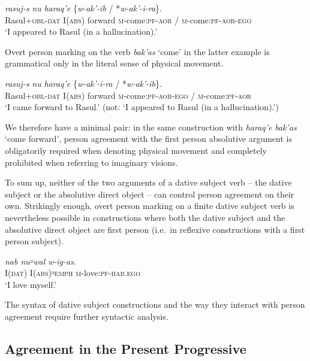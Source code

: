 ﻿\documentclass[output=paper]{langsci/langscibook}
\begin{document}
\ex %
\gll \emph{rasuj-s} \emph{nu} \emph{haraq'e} \{\emph{w-ak'-ib} / *\emph{w-ak'-i-ra}\}.\\
Rasul+\textsc{obl}-\textsc{dat} I(\textsc{abs}) forward \textsc{m}-come:\textsc{pf}-\textsc{aor} / \textsc{m}-come:\textsc{pf}-\textsc{aor}-\textsc{ego}\\
\glt `I appeared to Rasul (in a hallucination).'
\z
\z

Overt person marking on the verb \emph{bak'as} `come' in the latter
example is grammatical only in the literal sense of physical movement.

\ea %
\gll \emph{rasuj-s} \emph{nu} \emph{haraq'e} \{\emph{w-ak'-i-ra} / *\emph{w-ak'-ib}\}.\\
Rasul+\textsc{obl}-\textsc{dat} I(\textsc{abs}) forward \textsc{m}-come:\textsc{pf}-\textsc{aor}-\textsc{ego} / \textsc{m}-come:\textsc{pf}-\textsc{aor}\\\unskip
\glt `I came forward to Rasul.' (not: `I appeared to Rasul (in a
hallucination).')
\z

We therefore have a minimal pair: in the same construction with
\emph{haraq'e} \emph{bak'as} `come forward', person agreement with the first
person absolutive argument is obligatorily required when denoting
physical movement and completely prohibited when referring to imaginary
visions.

To sum up, neither of the two arguments of a dative subject verb – the
dative subject or the absolutive direct object – can control person
agreement on their own. Strikingly enough, overt person marking on a
finite dative subject verb is nevertheless possible in constructions
where both the dative subject and the absolutive direct object are first
person (i.e.\ in reflexive constructions with a first person subject).

\ea %
\gll \emph{nab} \emph{nu꞊wal} \emph{w-ig-as.}\\
I(\textsc{dat}) I(\textsc{abs})꞊\textsc{emph} \textsc{m}-love:\textsc{pf}-\textsc{hab}.\textsc{ego}\\
\glt `I love myself.'
\z

The syntax of dative subject constructions and the way they interact
with person agreement require further syntactic analysis.

\subsection{Agreement in the Present Progressive}\label{agreement-in-the-present-progressive}
\end{document}
